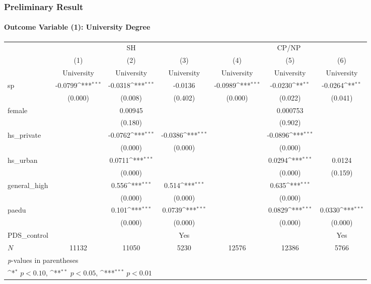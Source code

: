 \documentclass{beamer}
\def\sym#1{\ifmmode^{#1}\else\(^{#1}\)\fi}
\begin{document}
\begin{frame}[shrink=38] %
\frametitle{Preliminary Result}
\framesubtitle{Outcome Variable (1): University Degree}

\centering
\begin{tabular}{l*{6}c}
    \toprule
    &\multicolumn{3}{c}{SH} &\multicolumn{3}{c}{CP/NP} \\
    \cmidrule(l){2-4}\cmidrule(l){5-7}
    &\multicolumn{1}{c}{(1)}&\multicolumn{1}{c}{(2)}&\multicolumn{1}{c}{(3)}&\multicolumn{1}{c}{(4)}&\multicolumn{1}{c}{(5)}&\multicolumn{1}{c}{(6)} \\
    &\multicolumn{1}{c}{University}&\multicolumn{1}{c}{University}&\multicolumn{1}{c}{University}&\multicolumn{1}{c}{University}&\multicolumn{1}{c}{University}&\multicolumn{1}{c}{University} \\
    \midrule
    sp & -0.0799\sym{***}& -0.0318\sym{***}& -0.0136     & -0.0989\sym{***}& -0.0230\sym{**} & -0.0264\sym{**} \\
    & (0.000)     & (0.008)     & (0.402)     & (0.000)     & (0.022)     & (0.041)     \\
    [1em]
    female  &   & 0.00945     &   &   &    0.000753     &   \\
    &   & (0.180)     &   &   & (0.902)     &   \\
    [1em]
    hs\_private  &   & -0.0762\sym{***}& -0.0386\sym{***}&   & -0.0896\sym{***}&   \\
    &   & (0.000)     & (0.000)     &   & (0.000)     &   \\
    [1em]
    hs\_urban    &   &  0.0711\sym{***}&   &   &  0.0294\sym{***}&  0.0124     \\
    &   & (0.000)     &   &   & (0.000)     & (0.159)     \\
    [1em]
    general\_high&   &   0.556\sym{***}&   0.514\sym{***}&   &   0.635\sym{***}&   \\
    &   & (0.000)     & (0.000)     &   & (0.000)     &   \\
    [1em]
    paedu   &   &   0.101\sym{***}&  0.0739\sym{***}&   &  0.0829\sym{***}&  0.0330\sym{***}\\
    &   & (0.000)     & (0.000)     &   & (0.000)     & (0.000)     \\
    [1em]
    PDS\_control  &   &  &  Yes    &  &    &  Yes \\
    \hline
    \(N\)   &   11132     &   11050     &    5230     &   12576     &   12386     &    5766     \\
    \bottomrule
    \multicolumn{7}{l}{\footnotesize \textit{p}-values in parentheses} \\
    \multicolumn{7}{l}{\footnotesize \sym{*} \(p<0.10\), \sym{**} \(p<0.05\), \sym{***} \(p<0.01\)} \\
\end{tabular}

\end{frame}
\end{document}
